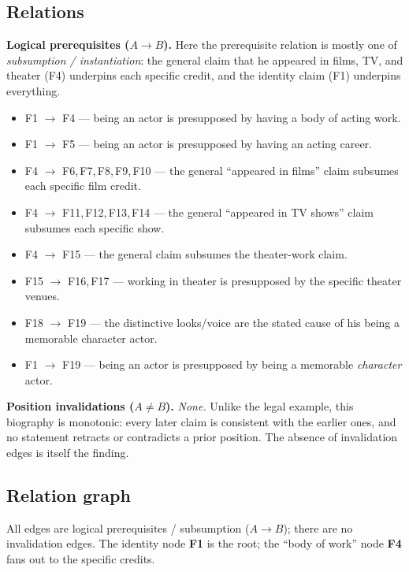 \documentclass[11pt]{article}
\begin{document}
\subsection*{Relations}

\textbf{Logical prerequisites ($A \rightarrow B$).} Here the prerequisite
relation is mostly one of \emph{subsumption / instantiation}: the general claim
that he appeared in films, TV, and theater (F4) underpins each specific credit,
and the identity claim (F1) underpins everything.

\begin{itemize}[leftmargin=*]
  \item F1 $\rightarrow$ F4 --- being an actor is presupposed by having a body of acting work.
  \item F1 $\rightarrow$ F5 --- being an actor is presupposed by having an acting career.
  \item F4 $\rightarrow$ F6,\,F7,\,F8,\,F9,\,F10 --- the general ``appeared in films'' claim subsumes each specific film credit.
  \item F4 $\rightarrow$ F11,\,F12,\,F13,\,F14 --- the general ``appeared in TV shows'' claim subsumes each specific show.
  \item F4 $\rightarrow$ F15 --- the general claim subsumes the theater-work claim.
  \item F15 $\rightarrow$ F16,\,F17 --- working in theater is presupposed by the specific theater venues.
  \item F18 $\rightarrow$ F19 --- the distinctive looks/voice are the stated cause of his being a memorable character actor.
  \item F1 $\rightarrow$ F19 --- being an actor is presupposed by being a memorable \emph{character} actor.
\end{itemize}

\noindent
\textbf{Position invalidations ($A \neq B$).} \emph{None.} Unlike the legal
example, this biography is monotonic: every later claim is consistent with the
earlier ones, and no statement retracts or contradicts a prior position. The
absence of invalidation edges is itself the finding.

\subsection*{Relation graph}

All edges are logical prerequisites / subsumption ($A \rightarrow B$); there are
no invalidation edges. The identity node \textbf{F1} is the root; the
``body of work'' node \textbf{F4} fans out to the specific credits.
\end{document}
